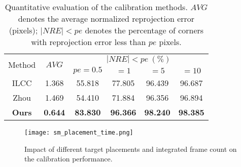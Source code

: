 \documentclass[journal]{vgtc}
\begin{document}
\begin{table}[!htb]
	\centering
		\begin{tabular}{cccccc}
			\toprule[2pt]
			\multicolumn{1}{c}{\multirow{2}{*}{Method}} & \multicolumn{1}{c}{\multirow{2}{*}{$AVG$}} & \multicolumn{4}{c}{$ |NRE|<pe~(\%) $}                                                                             \\ \cline{3-6} 
			\multicolumn{1}{c}{}                        & \multicolumn{1}{c}{}                         & \multicolumn{1}{c}{$pe=0.5$} & \multicolumn{1}{c}{$=1$} & $=5$ & $=10$ \\
			\midrule
			ILCC\cite{wang2017reflectance}                                        &     1.368		&		55.818		&		77.805		&		96.439		&		96.687              \\
			Zhou\cite{zhou2018automatic}                                        &      1.469		&		54.410		&		71.884		&		96.356		&		96.894              \\
			\textbf{Ours}                                        						&    \textbf{0.644}		&		\textbf{83.830}		&		\textbf{96.366}		&		\textbf{98.240}		&		\textbf{98.385}             \\
			\bottomrule[2pt]
		\end{tabular}
	\caption{Quantitative evaluation of the calibration methods. $AVG$ denotes the average normalized reprojection error (pixels); $|NRE|<pe$ denotes the percentage of corners with reprojection error less than $pe$ pixels.}
	\label{tab:compare}
\end{table}


\begin{figure}[!htb]
	\centering
	\texttt{[image: sm\_placement\_time.png]} 
	\caption{Impact of different target placements and integrated frame count on the calibration performance. }
	\label{fig:placement} 
	
\end{figure}
\end{document}
